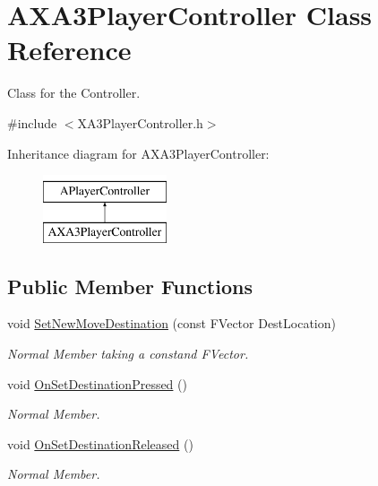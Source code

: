 \hypertarget{class_a_x_a3_player_controller}{}\section{A\+X\+A3\+Player\+Controller Class Reference}
\label{class_a_x_a3_player_controller}


Class for the Controller.  




{\ttfamily \#include $<$X\+A3\+Player\+Controller.\+h$>$}

Inheritance diagram for A\+X\+A3\+Player\+Controller\+:\begin{figure}[H]
\begin{center}
\leavevmode
\includegraphics[height=2.000000cm]{class_a_x_a3_player_controller}
\end{center}
\end{figure}
\subsection*{Public Member Functions}
\begin{DoxyCompactItemize}
\item 
void \hyperlink{class_a_x_a3_player_controller_aa419797ca4c60bb27a033a307c5ccbee}{Set\+New\+Move\+Destination} (const F\+Vector Dest\+Location)
\begin{DoxyCompactList}\small\item\em Normal Member taking a constand F\+Vector. \end{DoxyCompactList}\item 
void \hyperlink{class_a_x_a3_player_controller_ab559e4393ede764953acd4c868a41eef}{On\+Set\+Destination\+Pressed} ()
\begin{DoxyCompactList}\small\item\em Normal Member. \end{DoxyCompactList}\item 
void \hyperlink{class_a_x_a3_player_controller_a08d57685ee2b9f7f4d347707113f77c1}{On\+Set\+Destination\+Released} ()
\begin{DoxyCompactList}\small\item\em Normal Member. \end{DoxyCompactList}\end{DoxyCompactItemize}

